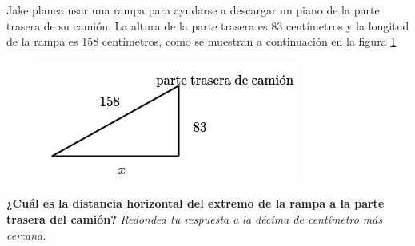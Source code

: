 Jake planea usar una rampa para ayudarse a descargar un piano de la parte trasera de su camión.
La altura de la parte trasera es 83 centímetros y la longitud de la rampa es 158 centímetros,
como se muestran a continuación en la figura \ref{fig:proverb_pitagoras_05}
\begin{figure}[H]
    \centering
    \includegraphics[width=0.4\linewidth]{../images/proverb_pitagoras_05.png}
    \caption{}
    \label{fig:proverb_pitagoras_05}
\end{figure}
\textbf{¿Cuál es la distancia horizontal del extremo de la rampa a la parte trasera del camión?}
\textit{Redondea tu respuesta a la décima de centímetro más cercana.}

\begin{solutionbox}{10cm}
\end{solutionbox}